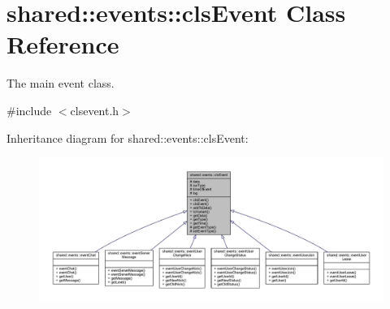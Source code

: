 \hypertarget{classshared_1_1events_1_1cls_event}{\section{shared\-:\-:events\-:\-:cls\-Event Class Reference}
\label{db/d8b/classshared_1_1events_1_1cls_event}
}


The main event class.  




{\ttfamily \#include $<$clsevent.\-h$>$}



Inheritance diagram for shared\-:\-:events\-:\-:cls\-Event\-:\nopagebreak
\begin{figure}[H]
\begin{center}
\leavevmode
\includegraphics[width=350pt]{d0/d20/classshared_1_1events_1_1cls_event__inherit__graph}
\end{center}
\end{figure}


